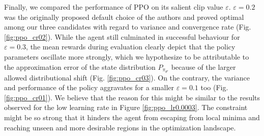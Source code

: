 \documentclass[a4paper, 11pt]{article}
\begin{document}
	Finally, we compared the performance of PPO on its salient clip value $\varepsilon$. $\varepsilon=0.2$ was the originally proposed default choice of the authors and proved optimal among our three candidates with regard to variance and convergence rate (Fig. \ref{fig:ppo_cr02}). While the agent still culminated in successful behaviour for $\varepsilon=0.3$, the mean rewards during evaluation clearly depict that the policy parameters oscillate more strongly, which we hypothesize to be attributable to the approximation error of the state distribution $P_{\pi_{\theta'}}$ because of the larger allowed distributional shift (Fig. \ref{fig:ppo_cr03}). On the contrary, the variance and performance of the policy aggravates for a smaller $\varepsilon=0.1$ too (Fig. \ref{fig:ppo_cr01}). We believe that the reason for this might be similar to the results observed for the low learning rate in Figure \ref{fig:ppo_lr0.0003}. The constraint might be so strong that it hinders the agent from escaping from local minima and reaching unseen and more desirable regions in the optimization landscape.
\end{document}
